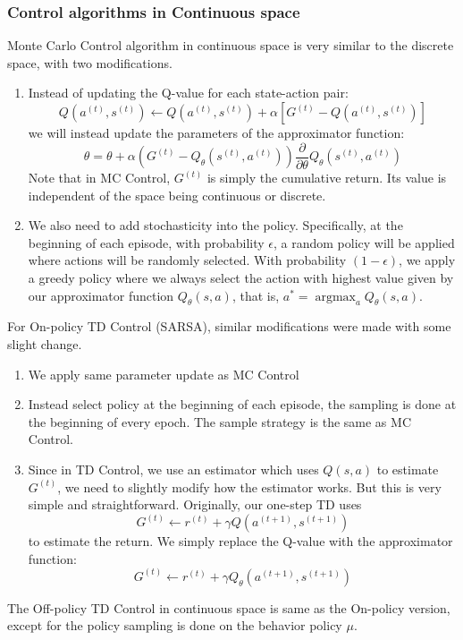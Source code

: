 \documentclass[11pt]{article}
\DeclareMathOperator*{\argmax}{argmax} %
\begin{document}
\subsubsection{Control algorithms in Continuous space}
Monte Carlo Control algorithm in continuous space is very similar to the discrete space, with two modifications.
\begin{enumerate}
    \item Instead of updating the Q-value for each state-action pair: $$Q\left(a^{(t)}, s^{(t)}\right) \leftarrow Q\left(a^{(t)}, s^{(t)}\right)+\alpha\left[G^{(t)}-Q\left(a^{(t)}, s^{(t)}\right)\right]$$ we will instead update the parameters of the approximator function: $$\theta=\theta+\alpha\left(G^{(t)}-Q_{\theta}\left(s^{(t)}, a^{(t)}\right)\right) \frac{\partial}{\partial \theta} Q_{\theta}\left(s^{(t)}, a^{(t)}\right)$$ Note that in MC Control, $G^{(t)}$ is simply the cumulative return. Its value is independent of the space being continuous or discrete.
    \item We also need to add stochasticity into the policy. Specifically, at the beginning of each episode, with probability $\epsilon$, a random policy will be applied where actions will be randomly selected. With probability $(1-\epsilon)$, we apply a greedy policy where we always select the action with highest value given by our approximator function $Q_\theta(s, a)$, that is, $a^* = \argmax_a Q_\theta(s, a)$.
\end{enumerate}
For On-policy TD Control (SARSA), similar modifications were made with some slight change.
\begin{enumerate}
    \item We apply same parameter update as MC Control
    \item Instead select policy at the beginning of each episode, the sampling is done at the beginning of every epoch. The sample strategy is the same as MC Control.
    \item Since in TD Control, we use an estimator which uses $Q(s, a)$ to estimate $G^{(t)}$, we need to slightly modify how the estimator works. But this is very simple and straightforward. Originally, our one-step TD uses $$G^{(t)} \leftarrow r^{(t)}+\gamma Q\left(a^{(t+1)}, s^{(t+1)}\right)$$ to estimate the return. We simply replace the Q-value with the approximator function: $$G^{(t)} \leftarrow r^{(t)}+\gamma Q_{\theta}\left(a^{(t+1)}, s^{(t+1)}\right)$$
\end{enumerate}
The Off-policy TD Control in continuous space is same as the On-policy version, except for the policy sampling is done on the behavior policy $\mu$.
\end{document}
